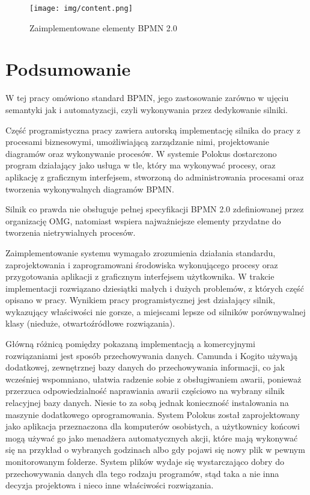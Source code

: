 \documentclass[declaration,shortabstract,mgr]{iithesis}
\newcommand{\bpmn}{BPMN }
\newcommand{\bpmnnospace}{BPMN}
\begin{document}
\newpage
\begin{figure}[H]
    \texttt{[image: img/content.png]}
    \caption{Zaimplementowane elementy \bpmn 2.0}
    \label{fig:features}
\end{figure}

\chapter{Podsumowanie}
W tej pracy omówiono standard \bpmnnospace, jego zastosowanie zarówno w ujęciu semantyki jak i automatyzacji, czyli wykonywania przez dedykowanie silniki. 

Część programistyczna pracy zawiera autorską implementację silnika do pracy z procesami biznesowymi, umożliwiającą zarządzanie nimi, projektowanie diagramów oraz wykonywanie procesów. W systemie Polokus dostarczono program działający jako usługa w tle, który ma wykonywać procesy, oraz aplikację z graficznym interfejsem, stworzoną do administrowania procesami oraz tworzenia wykonywalnych diagramów \bpmnnospace. 

Silnik co prawda nie obsługuje pełnej specyfikacji \bpmn 2.0 zdefiniowanej przez organizację OMG, natomiast wspiera najważniejsze elementy przydatne do tworzenia nietrywialnych procesów.

Zaimplementowanie systemu wymagało zrozumienia działania standardu,
zaprojektowania i zaprogramowani środowiska wykonującego procesy oraz
przygotowania aplikacji z graficznym interfejsem użytkownika. 
W trakcie implementacji rozwiązano dziesiątki małych i dużych problemów, z których część opisano w pracy. Wynikiem pracy
programistycznej jest działający silnik, wykazujący właściwości
nie gorsze, a miejscami lepsze od silników porównywalnej klasy
(nieduże, otwartoźródłowe rozwiązania).

Główną różnicą pomiędzy pokazaną implementacją a komercyjnymi rozwiązaniami jest sposób przechowywania danych. Camunda i Kogito używają dodatkowej, zewnętrznej bazy danych do przechowywania informacji, co jak wcześniej wspomniano, ułatwia radzenie sobie z obsługiwaniem awarii, ponieważ przerzuca odpowiedzialność naprawiania awarii częściowo na wybrany silnik relacyjnej bazy danych. Niesie to za sobą jednak konieczność instalowania na maszynie dodatkowego oprogramowania. System Polokus został zaprojektowany jako aplikacja przeznaczona dla komputerów osobistych, a użytkownicy końcowi mogą używać go jako menadżera automatycznych akcji, które mają wykonywać się na przykład o wybranych godzinach albo gdy pojawi się nowy plik w pewnym monitorowanym folderze. System plików wydaje się wystarczająco dobry do przechowywania danych dla tego rodzaju programów, stąd
taka a nie inna decyzja projektowa i nieco inne właściwości rozwiązania.
\end{document}
